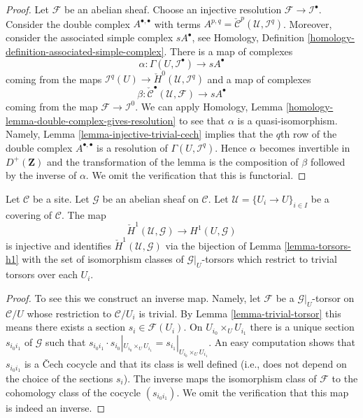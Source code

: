 \begin{proof}
Let $\mathcal{F}$ be an abelian sheaf. Choose an injective resolution
$\mathcal{F} \to \mathcal{I}^\bullet$. Consider the double complex
$A^{\bullet, \bullet}$ with terms
$A^{p, q} = \check{\mathcal{C}}^p(\mathcal{U}, \mathcal{I}^q)$.
Moreover, consider the associated simple complex
$sA^\bullet$, see
Homology, Definition \ref{homology-definition-associated-simple-complex}.
There is a map of complexes
$$
\alpha :
\Gamma(U, \mathcal{I}^\bullet)
\longrightarrow
sA^\bullet
$$
coming from the maps
$\mathcal{I}^q(U) \to \check{H}^0(\mathcal{U}, \mathcal{I}^q)$
and a map of complexes
$$
\beta :
\check{\mathcal{C}}^\bullet(\mathcal{U}, \mathcal{F})
\longrightarrow
sA^\bullet
$$
coming from the map $\mathcal{F} \to \mathcal{I}^0$.
We can apply
Homology, Lemma \ref{homology-lemma-double-complex-gives-resolution}
to see that $\alpha$ is a quasi-isomorphism.
Namely, Lemma \ref{lemma-injective-trivial-cech} implies that
the $q$th row of the double complex $A^{\bullet, \bullet}$ is a
resolution of $\Gamma(U, \mathcal{I}^q)$.
Hence $\alpha$ becomes invertible in $D^{+}(\mathbf{Z})$ and
the transformation of the lemma is the composition of $\beta$
followed by the inverse of $\alpha$. We omit the verification
that this is functorial.
\end{proof}

\begin{lemma}
\label{lemma-cech-h1}
Let $\mathcal{C}$ be a site. Let $\mathcal{G}$ be an abelian sheaf
on $\mathcal{C}$. Let $\mathcal{U} = \{U_i \to U\}_{i \in I}$ be a
covering of $\mathcal{C}$. The map
$$
\check{H}^1(\mathcal{U}, \mathcal{G})
\longrightarrow
H^1(U, \mathcal{G})
$$
is injective and identifies $\check{H}^1(\mathcal{U}, \mathcal{G})$ via
the bijection of Lemma \ref{lemma-torsors-h1}
with the set of isomorphism classes of $\mathcal{G}|_U$-torsors
which restrict to trivial torsors over each $U_i$.
\end{lemma}

\begin{proof}
To see this we construct an inverse map. Namely, let $\mathcal{F}$ be a
$\mathcal{G}|_U$-torsor on $\mathcal{C}/U$ whose restriction to
$\mathcal{C}/U_i$ is trivial. By Lemma \ref{lemma-trivial-torsor}
this means there
exists a section $s_i \in \mathcal{F}(U_i)$. On $U_{i_0} \times_U U_{i_1}$
there is a unique section $s_{i_0i_1}$ of $\mathcal{G}$ such that
$s_{i_0i_1} \cdot s_{i_0}|_{U_{i_0} \times_U U_{i_1}} =
s_{i_1}|_{U_{i_0} \times_U U_{i_1}}$. An easy computation shows
that $s_{i_0i_1}$ is a {\v C}ech cocycle and that its class is well
defined (i.e., does not depend on the choice of the sections $s_i$).
The inverse maps the isomorphism class of $\mathcal{F}$ to the cohomology
class of the cocycle $(s_{i_0i_1})$.
We omit the verification that this map is indeed an inverse.
\end{proof}


